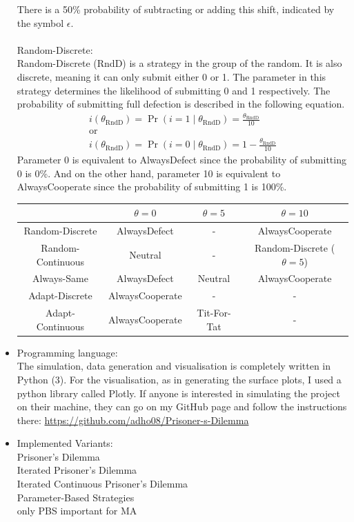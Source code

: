 \documentclass{article}
\begin{document}
\begin{itemize}
There is a 50\% probability of subtracting or adding this shift, indicated by the symbol $\epsilon$.\\
		\\Random-Discrete:\\
Random-Discrete (RndD) is a strategy in the group of the random.
It is also discrete, meaning it can only submit either 0 or 1.
The parameter in this strategy determines the likelihood of submitting 0 and 1 respectively.
The probability of submitting full defection is described in the following equation.
$$
\begin{array}{c}
i(\theta_{\mathrm{RndD}}) = \Pr(i = 1 \mid \theta_{\mathrm{RndD}}) = \frac{\theta_{\mathrm{RndD}}}{10}\\
\mathrm{or}\\
i(\theta_{\mathrm{RndD}}) = \Pr(i = 0 \mid \theta_{\mathrm{RndD}}) = 1 - \frac{\theta_{\mathrm{RndD}}}{10}
\end{array}
$$
Parameter 0 is equivalent to AlwaysDefect since the probability of submitting 0 is 0\%.
And on the other hand, parameter 10 is equivalent to AlwaysCooperate since the probability of submitting 1 is 100\%.\\

\begin{center}
\begin{tabular}{ c|c|c|c }
   & $\theta = 0$ & $\theta = 5$ & $\theta = 10$ \\ 
   \hline
	Random-Discrete & AlwaysDefect & - & AlwaysCooperate \\  
   \hline
	Random-Continuous & Neutral & - & Random-Discrete ($\theta = 5$) \\
   \hline
	Always-Same & AlwaysDefect & Neutral & AlwaysCooperate \\
   \hline
	Adapt-Discrete & AlwaysCooperate & - & -\\
   \hline
	Adapt-Continuous & AlwaysCooperate & Tit-For-Tat & -
\end{tabular}
\end{center}

	\item Programming language:\\

The simulation, data generation and visualisation is completely written in Python (3).
For the visualisation, as in generating the surface plots, I used a python library called Plotly.
If anyone is interested in simulating the project on their machine, they can go on my GitHub page and follow the instructions there:
\href{https://github.com/adho08/Prisoner-s-Dilemma}{https://github.com/adho08/Prisoner-s-Dilemma}

	\item Implemented Variants:\\
		Prisoner's Dilemma\\
		Iterated Prisoner's Dilemma\\
		Iterated Continuous Prisoner's Dilemma\\
		Parameter-Based Strategies\\
		only PBS important for MA\\
	
\end{itemize}
\end{document}
